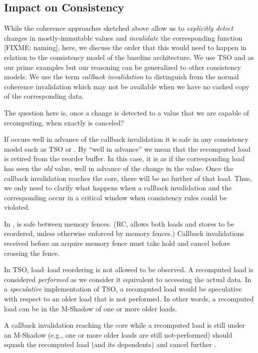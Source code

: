\subsection{Impact on Consistency}
\label{sec:consistency}
While the coherence approaches sketched above allow us to \emph{explicitly detect} changes in mostly-immutable values and \emph{invalidate} the corresponding {\recomp} function {\color{red} [FIXME: naming]}, here, we discuss the order that this would need to happen in relation to the consistency model of the baseline architecture.
We use TSO and {\rc} as our prime examples but our reasoning can be generalized to other consistency models. We use the term \emph{callback invalidation} to distinguish from the normal coherence invalidation which may not be available when we have no cached copy of the corresponding data.

The question here is, once a change is detected to a value that we are capable of recomputing, when exactly is {\recomp} canceled? 

If {\recomp} occurs well in advance of the callback invalidation it is safe in any consistency model such as TSO or {\rc}. By ``well in advance'' we mean that the recomputed load is retired from the reorder buffer. In this case, it is as if the corresponding load has seen the \emph{old} value, well in advance of the change in the value. Once the callback invalidation reaches the core, there will be no further {\recomp} of that load.
Thus, we only need to clarify what happens when a callback invalidation and the corresponding {\recomp} occur in a critical window when consistency rules could be violated.

In {\rc}, {\recomp} is safe between memory fences. (RC, allows both loads and stores to be reordered, unless otherwise enforced by memory fences.) Callback invalidations received before an acquire memory fence must take hold and cancel {\recomp} before crossing the fence.

In TSO, load--load reordering is not allowed to be observed. A recomputed load is considered \emph{performed} as we consider it equivalent to accessing the actual data. In a \emph{speculative} implementation of TSO,  a recomputed load would be speculative with respect to an older load that is not performed. In other words, a recomputed load can be  in the M-Shadow of one or more older loads.

A callback invalidation reaching the core while a recomputed load is still under an M-Shadow (e.g., one or more older loads are still not-performed) should squash the recomputed load (and its dependents) and cancel further {\recomp}. 

